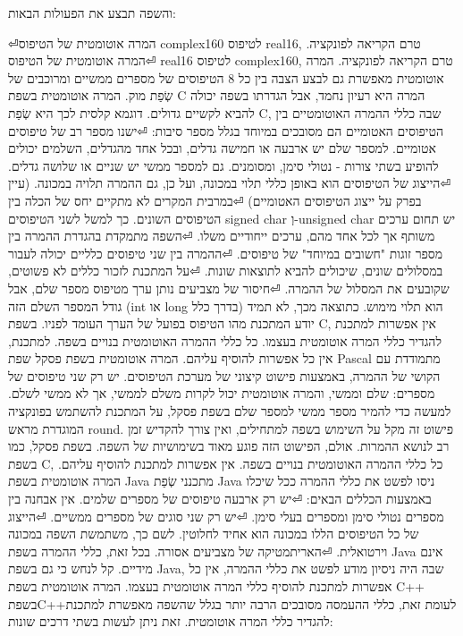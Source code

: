       והשפה תבצע את הפעולות הבאות:
      \begin{ציינון}
⏎המרה אוטומטית של הטיפוס complex160 לטיפוס real16, טרם הקריאה לפונקציה.
⏎המרה אוטומטית של הטיפוס real16 לטיפוס complex160, טרם הקריאה לפונקציה.
      המרה אוטומטית מאפשרת גם לבצע הצבה בין כל 8 הטיפוסים של מספרים ממשיים ומרוכבים של שְׂפַת מוק.
      המרה אוטומטית בשפת C
      המרה היא רעיון נחמד, אבל הגדרתו בשפה יכולה להביא לקשיים גדולים. דוגמא קלסית לכך היא שְׂפַת C, שבה כללי ההמרה האוטומטיים בין הטיפוסים האטומיים הם מסובכים במיוחד בגלל מספר סיבות:
⏎ישנו מספר רב של טיפוסים אטומיים. למספר שלם יש ארבעה או חמישה גדלים, ובכל אחד מהגדלים, השלמים יכולים להופיע בשתי צורות - נטולי סימן, ומסומנים. גם למספר ממשי יש שניים או שלושה גדלים.
⏎הייצוג של הטיפוסים הוא באופן כללי תלוי במכונה, ועל כן, גם ההמרה תלויה במכונה. (עיין בפרק על ייצוג הטיפוסים האטומיים)
⏎במרבית המקרים לא מתקיים יחס של הכלה בין הטיפוסים השונים. כך למשל לשני הטיפוסים signed char וְ-unsigned char יש תחום ערכים משותף אך לכל אחד מהם, ערכים ייחודיים משלו.
⏎השפה מתמקדת בהגדרת ההמרה בין מספר זוגות "חשובים במיוחד" של טיפוסים.
⏎ההמרה בין שני טיפוסים כלליים יכולה לעבור במסלולים שונים, שיכולים להביא לתוצאות שונות.
⏎על המתכנת לזכור כללים לא פשוטים, שקובעים את המסלול של ההמרה.
⏎חיסור של מצביעים נותן ערך מטיפוס מספר שלם, אבל גודל המספר השלם הזה (int או long בדרך כלל) הוא תלוי מימוש. כתוצאה מכך, לא תמיד יודע המתכנת מהו הטיפוס בפועל של הערך העומד לפניו.
      בשפת C, אין אפשרות למתכנת להגדיר כללי המרה אוטומטית בעצמו. כל כללי ההמרה האוטומטית בנויים בשפה. למתכנת, אין כל אפשרות להוסיף עליהם.
      המרה אוטומטית בשפת פסקל
      שפת Pascal מתמודדת עם הקושי של ההמרה, באמצעות פישוט קיצוני של מערכת הטיפוסים. יש רק שני טיפוסים של מספרים: שלם וממשי, והמרה אוטומטית יכול לקרות משלם לממשי, אך לא ממשי לשלם. למעשה כדי להמיר מספר ממשי למספר שלם בשפת פסקל, על המתכנת להשתמש בפונקציה המוגדרת מראש round.
      פישוט זה מקל על השימוש בשפה למתחילים, ואין צורך להקדיש זמן רב לנושא ההמרות. אולם, הפישוט הזה פוגע מאוד בשימושיות של השפה.
      בשפת פסקל, כמו בשפת C, כל כללי ההמרה האוטומטית בנויים בשפה. אין אפשרות למתכנת להוסיף עליהם.
      המרה אוטומטית בשפת Java
      מתכנני שְׂפַת Java ניסו לפשט את כללי ההמרה ככל שיכלו באמצעות הכללים הבאים:
⏎יש רק ארבעה טיפוסים של מספרים שלמים. אין אבחנה בין מספרים נטולי סימן ומספרים בעלי סימן.
⏎יש רק שני סוגים של מספרים ממשיים.
⏎הייצוג של כל הטיפוסים הללו במכונה הוא אחיד לחלוטין. לשם כך, משתמשת השפה במכונה וירטואלית.
⏎האריתמטיקה של מצביעים אסורה.
      בכל זאת, כללי ההמרה בשפת Java אינם מידיים. קל לנחש כי גם בשפת Java, שבה היה ניסיון מודע לפשט את כללי ההמרה, אין כל אפשרות למתכנת להוסיף כללי המרה אוטומטית בעצמו.
      המרה אוטומטית בשפת C++
      בשפתC++לעומת זאת, כללי ההעמסה מסובכים הרבה יותר בגלל שהשפה מאפשרת למתכנת להגדיר כללי המרה אוטומטית. זאת ניתן לעשות בשתי דרכים שונות:
  \end{ציינון}

